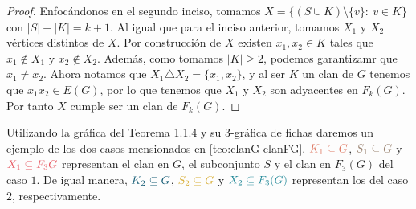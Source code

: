 \begin{proof}
        Enfoc\'andonos en el segundo inciso, tomamos $X = \{(S\cup K) \setminus
        \{v\}\colon\ v \in K \}$ con $|S| + |K| = k+1$. Al igual que para el inciso
        anterior, tomamos $X_1$ y $X_2$ v\'ertices distintos de $X$. Por
        construcci\'on de $X$ existen $x_1, x_2 \in K$ tales que $x_1 \notin
        X_1$ y $x_2 \notin X_2$. Adem\'as, como tomamos $|K| \geq 2$, podemos
        garantizamr que $x_1 \neq x_2$. Ahora notamos que $X_1 \triangle X_2 =
        \{x_1, x_2\}$, y al ser $K$ un clan de $G$ tenemos que $x_1x_2 \in
        E(G)$, por lo que tenemos que $X_1$ y $X_2$ son adyacentes en $F_k(G)$.
        Por tanto $X$ cumple ser un clan de $F_k(G)$.
    \end{proof}
    
    Utilizando la gr\'afica del Teorema 1.1.4 y su $3$-gr\'afica de fichas
    daremos un ejemplo de los dos casos mensionados en \cref{teo:clanG-clanFG}.
    ${\color{salmon}K_1 \subseteq G}$, ${\color{baige}S_1\subseteq G}$ y
    ${\color{rosa}X_1\subseteq F_3{G}}$ representan el clan en $G$, el
    subconjunto $S$ y el clan en $F_3(G)$ del caso $1$. De igual manera,
    ${\color{azulOscuro}K_2\subseteq G}$, ${\color{amarilloOscuro}S_2\subseteq G}$
    y ${\color{azulMetal}X_2 \subseteq F_3(G)}$ representan los del caso $2$, respectivamente.

